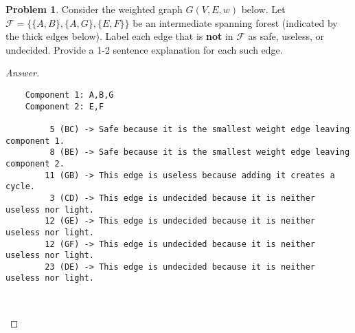 \documentclass[11pt]{article}
\theoremstyle{definition}
\theoremstyle{definition}
\newtheorem{required}{Problem}
\theoremstyle{definition}
\begin{document}
\begin{required}
Consider the weighted graph $G(V, E, w)$ below. Let $\mathcal{F} = \{ \{A, B\}, \{A, G\}, \{E, F\}\}$ be an intermediate spanning forest (indicated by the thick edges below). Label each edge that is \textbf {not} in $\mathcal{F}$ as safe, useless, or undecided. Provide a 1-2 sentence explanation for each such edge.


\begin{center}
\end{center}
\end{required}

\begin{proof}[Answer] $ $ 
\begin{verbatim}
    Component 1: A,B,G
    Component 2: E,F

         5 (BC) -> Safe because it is the smallest weight edge leaving component 1.
         8 (BE) -> Safe because it is the smallest weight edge leaving component 2. 
        11 (GB) -> This edge is useless because adding it creates a cycle. 
         3 (CD) -> This edge is undecided because it is neither useless nor light. 
        12 (GE) -> This edge is undecided because it is neither useless nor light. 
        12 (GF) -> This edge is undecided because it is neither useless nor light. 
        23 (DE) -> This edge is undecided because it is neither useless nor light. 
             
            
\end{verbatim}
\end{proof}
\end{document}
